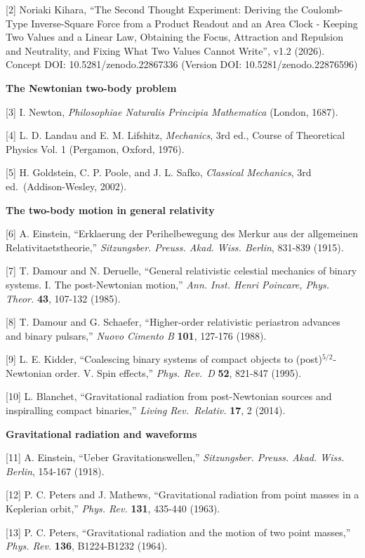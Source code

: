 \documentclass[
  a4paper,
]{article}
\begin{document}
{[}2{]} Noriaki Kihara, ``The Second Thought Experiment: Deriving the
Coulomb-Type Inverse-Square Force from a Product Readout and an Area
Clock - Keeping Two Values and a Linear Law, Obtaining the Focus,
Attraction and Repulsion and Neutrality, and Fixing What Two Values
Cannot Write'', v1.2 (2026). Concept DOI: 10.5281/zenodo.22867336
(Version DOI: 10.5281/zenodo.22876596)

\textbf{The Newtonian two-body problem}

{[}3{]} I. Newton, \emph{Philosophiae Naturalis Principia Mathematica}
(London, 1687).

{[}4{]} L. D. Landau and E. M. Lifshitz, \emph{Mechanics}, 3rd ed.,
Course of Theoretical Physics Vol. 1 (Pergamon, Oxford, 1976).

{[}5{]} H. Goldstein, C. P. Poole, and J. L. Safko, \emph{Classical
Mechanics}, 3rd ed.~(Addison-Wesley, 2002).

\textbf{The two-body motion in general relativity}

{[}6{]} A. Einstein, ``Erklaerung der Perihelbewegung des Merkur aus der
allgemeinen Relativitaetstheorie,'' \emph{Sitzungsber. Preuss. Akad.
Wiss. Berlin}, 831-839 (1915).

{[}7{]} T. Damour and N. Deruelle, ``General relativistic celestial
mechanics of binary systems. I. The post-Newtonian motion,'' \emph{Ann.
Inst. Henri Poincare, Phys. Theor.} \textbf{43}, 107-132 (1985).

{[}8{]} T. Damour and G. Schaefer, ``Higher-order relativistic
periastron advances and binary pulsars,'' \emph{Nuovo Cimento B}
\textbf{101}, 127-176 (1988).

{[}9{]} L. E. Kidder, ``Coalescing binary systems of compact objects to
(post)\(^{5/2}\)-Newtonian order. V. Spin effects,'' \emph{Phys. Rev.~D}
\textbf{52}, 821-847 (1995).

{[}10{]} L. Blanchet, ``Gravitational radiation from post-Newtonian
sources and inspiralling compact binaries,'' \emph{Living Rev.~Relativ.}
\textbf{17}, 2 (2014).

\textbf{Gravitational radiation and waveforms}

{[}11{]} A. Einstein, ``Ueber Gravitationswellen,'' \emph{Sitzungsber.
Preuss. Akad. Wiss. Berlin}, 154-167 (1918).

{[}12{]} P. C. Peters and J. Mathews, ``Gravitational radiation from
point masses in a Keplerian orbit,'' \emph{Phys. Rev.} \textbf{131},
435-440 (1963).

{[}13{]} P. C. Peters, ``Gravitational radiation and the motion of two
point masses,'' \emph{Phys. Rev.} \textbf{136}, B1224-B1232 (1964).
\end{document}
